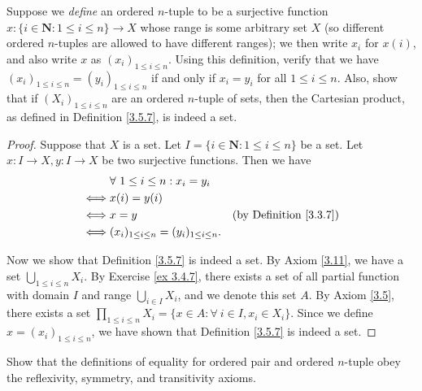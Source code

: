 \begin{exercise}\label{ex 3.5.2}
    Suppose we \emph{define} an ordered \(n\)-tuple to be a surjective function \(x : \{i \in \mathbf{N} : 1 \leq i \leq n\} \to X\) whose range is some arbitrary set \(X\) (so different ordered \(n\)-tuples are allowed to have different ranges);
    we then write \(x_i\) for \(x(i)\), and also write \(x\) as \((x_i)_{1 \leq i \leq n}\).
    Using this definition, verify that we have \((x_i)_{1 \leq i \leq n} = (y_i)_{1 \leq i \leq n}\) if and only if \(x_i = y_i\) for all \(1 \leq i \leq n\).
    Also, show that if \((X_i)_{1 \leq i \leq n}\) are an ordered \(n\)-tuple of sets, then the Cartesian product, as defined in Definition \ref{3.5.7}, is indeed a set.
\end{exercise}

\begin{proof}
    Suppose that \(X\) is a set.
    Let \(I = \{i \in \mathbf{N} : 1 \leq i \leq n\}\) be a set.
    Let \(x : I \to X, y : I \to X\) be two surjective functions.
    Then we have
    \begin{align*}
             & \forall\ 1 \leq i \leq n : x_i = y_i                                                    \\
        \iff & x(i) = y(i)                                                                             \\
        \iff & x = y                                              & \text{(by Definition \ref{3.3.7})} \\
        \iff & (x_i)_{1 \leq i \leq n} = (y_i)_{1 \leq i \leq n}.
    \end{align*}

    Now we show that Definition \ref{3.5.7} is indeed a set.
    By Axiom \ref{3.11}, we have a set \(\bigcup_{1 \leq i \leq n} X_i\).
    By Exercise \ref{ex 3.4.7}, there exists a set of all partial function with domain \(I\) and range \(\bigcup_{i \in I} X_i\), and we denote this set \(A\).
    By Axiom \ref{3.5}, there exists a set \(\prod_{1 \leq i \leq n} X_i = \{x \in A : \forall\ i \in I, x_i \in X_i\}\).
    Since we define \(x = (x_i)_{1 \leq i \leq n}\), we have shown that Definition \ref{3.5.7} is indeed a set.
\end{proof}

\begin{exercise}\label{ex 3.5.3}
    Show that the definitions of equality for ordered pair and ordered \(n\)-tuple obey the reflexivity, symmetry, and transitivity axioms.
\end{exercise}

